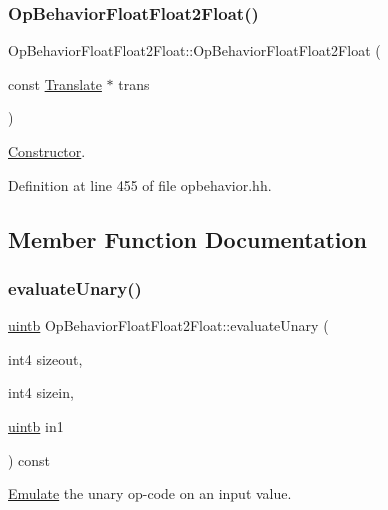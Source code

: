 \subsubsection{\texorpdfstring{OpBehaviorFloatFloat2Float()}{OpBehaviorFloatFloat2Float()}}
{\footnotesize\ttfamily Op\+Behavior\+Float\+Float2\+Float\+::\+Op\+Behavior\+Float\+Float2\+Float (\begin{DoxyParamCaption}\item[{const \mbox{\hyperlink{class_translate}{Translate}} $\ast$}]{trans }\end{DoxyParamCaption})\hspace{0.3cm}{\ttfamily [inline]}}



\mbox{\hyperlink{class_constructor}{Constructor}}. 



Definition at line 455 of file opbehavior.\+hh.



\subsection{Member Function Documentation}
\mbox{\label{class_op_behavior_float_float2_float_af536141f8e37c7800ce9f9ec9df51d20}} 
\subsubsection{\texorpdfstring{evaluateUnary()}{evaluateUnary()}}
{\footnotesize\ttfamily \mbox{\hyperlink{types_8h_a2db313c5d32a12b01d26ac9b3bca178f}{uintb}} Op\+Behavior\+Float\+Float2\+Float\+::evaluate\+Unary (\begin{DoxyParamCaption}\item[{int4}]{sizeout,  }\item[{int4}]{sizein,  }\item[{\mbox{\hyperlink{types_8h_a2db313c5d32a12b01d26ac9b3bca178f}{uintb}}}]{in1 }\end{DoxyParamCaption}) const\hspace{0.3cm}{\ttfamily [virtual]}}



\mbox{\hyperlink{class_emulate}{Emulate}} the unary op-\/code on an input value. 


